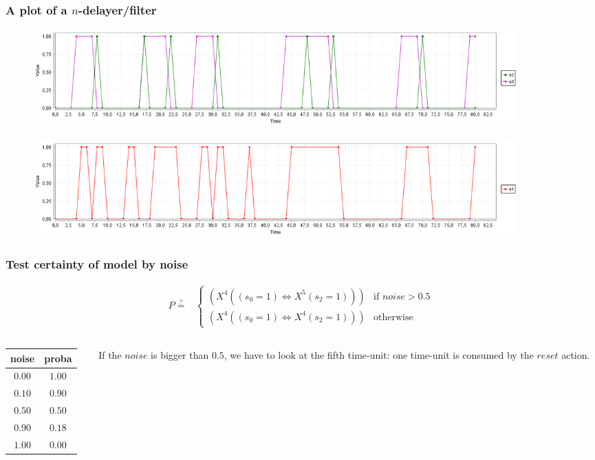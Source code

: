 \begin{frame}
  \frametitle{A plot of a $n$-delayer/filter}

  \begin{figure}
    \includegraphics[width=0.9\textwidth]{pic/simple_serie_corr_plot.png}
  \end{figure}

  \begin{figure}
    \includegraphics[width=0.9\textwidth]{pic/simple_serie_corr_plot_s1.png}
  \end{figure}

\end{frame}

\begin{frame}
  \frametitle{Test certainty of model by noise}
  \begin{align*}
    P \stackrel{?}{=} &
    \begin{cases}
      (X^4 ((s_0=1) \Leftrightarrow X^5 (s_2=1))) & \text{if } noise > 0.5 \\
      (X^4 ((s_0=1) \Leftrightarrow X^4 (s_2=1))) & \text{otherwise}
    \end{cases}
  \end{align*}



  \begin{columns}
    \begin{column}{0.45\textwidth}
      \begin{table}[]
        \begin{tabular}{cc}
          noise  & proba  \\ \hline
          $0.00$ & $1.00$ \\
          $0.10$ & $0.90$ \\
          $0.50$ & $0.50$ \\
          $0.90$ & $0.18$ \\
          $1.00$ & $0.00$
        \end{tabular}
      \end{table}
    \end{column}
    \begin{column}{0.45\textwidth}  %
      \begin{remark}
        If the $noise$ is bigger than $0.5$, we have to look at the fifth time-unit: one time-unit is consumed by the $reset$ action.
      \end{remark}
    \end{column}
  \end{columns}

\end{frame}

